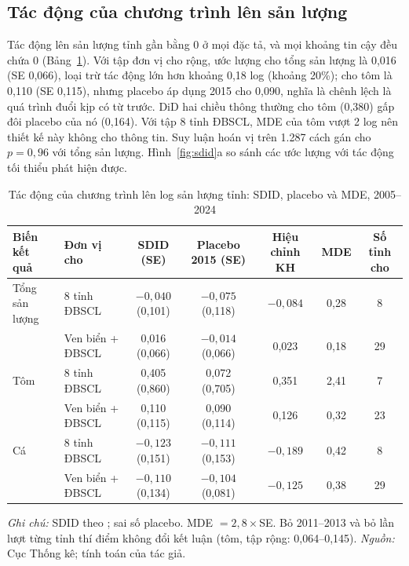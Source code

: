 \documentclass[12pt,a4paper]{article}
\begin{document}
\subsection{Tác động của chương trình lên sản lượng}

Tác động lên sản lượng tỉnh gần bằng 0 ở mọi đặc tả, và mọi khoảng tin cậy đều chứa 0 (Bảng~\ref{tab:did}). Với tập đơn vị cho rộng, ước lượng cho tổng sản lượng là 0,016 (SE 0,066), loại trừ tác động lớn hơn khoảng 0,18 log (khoảng 20\%); cho tôm là 0,110 (SE 0,115), nhưng placebo áp dụng 2015 cho 0,090, nghĩa là chênh lệch là quá trình đuổi kịp có từ trước. DiD hai chiều thông thường cho tôm (0,380) gấp đôi placebo của nó (0,164). Với tập 8 tỉnh ĐBSCL, MDE của tôm vượt 2 log nên thiết kế này không cho thông tin. Suy luận hoán vị trên 1.287 cách gán cho $p=0{,}96$ với tổng sản lượng. Hình~\ref{fig:sdid}a so sánh các ước lượng với tác động tối thiểu phát hiện được.

\begin{table}[!tbp]
\centering\footnotesize
\setlength{\tabcolsep}{4pt}
\caption{Tác động của chương trình lên log sản lượng tỉnh: SDID, placebo và MDE, 2005--2024}
\label{tab:did}
\begin{tabular}{@{}llccccc@{}}
\toprule
Biến kết quả & Đơn vị cho & SDID (SE) & Placebo 2015 (SE) & Hiệu chỉnh KH & MDE & Số tỉnh cho \\
\midrule
Tổng sản lượng & 8 tỉnh ĐBSCL & $-0{,}040$ (0,101) & $-0{,}075$ (0,118) & $-0{,}084$ & 0,28 & 8 \\
 & Ven biển + ĐBSCL & 0,016 (0,066) & $-0{,}014$ (0,066) & 0,023 & 0,18 & 29 \\
Tôm & 8 tỉnh ĐBSCL & 0,405 (0,860) & 0,072 (0,705) & 0,351 & 2,41 & 7 \\
 & Ven biển + ĐBSCL & 0,110 (0,115) & 0,090 (0,114) & 0,126 & 0,32 & 23 \\
Cá & 8 tỉnh ĐBSCL & $-0{,}123$ (0,151) & $-0{,}111$ (0,153) & $-0{,}189$ & 0,42 & 8 \\
 & Ven biển + ĐBSCL & $-0{,}110$ (0,134) & $-0{,}104$ (0,081) & $-0{,}125$ & 0,38 & 29 \\
\bottomrule
\end{tabular}
\begin{minipage}{\textwidth}\footnotesize
\textit{Ghi chú:} SDID theo \textcite{arkhangelsky2021}; sai số placebo. MDE $=2{,}8\times$SE. Bỏ 2011--2013 và bỏ lần lượt từng tỉnh thí điểm không đổi kết luận (tôm, tập rộng: 0,064--0,145). \textit{Nguồn:} Cục Thống kê; tính toán của tác giả.
\end{minipage}
\end{table}
\end{document}
